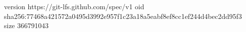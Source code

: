 version https://git-lfs.github.com/spec/v1
oid sha256:77468a421572a0495d3992e957f1c23a18a5eabf8ef8cc1ef244d4bec2dd95f3
size 366791043
